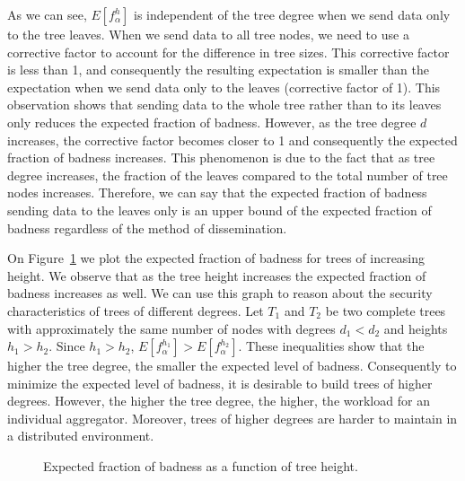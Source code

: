 \documentclass[11pt,twocolumn]{MyTightStyle}
\theoremstyle{plain}
\theoremstyle{definition}
\theoremstyle{remark}
\numberwithin{equation}{section}
\begin{document}
  As we can see, $E[f^h_\alpha]$ is independent of the tree
  degree when we send data only to the tree leaves. When we send data
  to all tree nodes, we need to use a corrective factor to account for
  the difference in tree sizes. This corrective factor is less than
  1, and consequently the resulting expectation is smaller than the
  expectation when we send data only to the leaves (corrective factor
  of 1). This observation shows that sending data to the whole tree
  rather than to its leaves only reduces the expected fraction of
  badness. However, as the tree degree $d$ increases, the corrective
  factor becomes closer to 1 and consequently the expected fraction of
  badness increases. This phenomenon is due to the fact that as tree
  degree increases, the fraction of the leaves compared to the total
  number of tree nodes increases. Therefore, we can say that the
  expected fraction of badness sending data to the leaves only is an
  upper bound of the expected fraction of badness regardless of the
  method of dissemination. 



  On Figure~\ref{fig:exp_badness} we plot the expected fraction of
  badness for trees of increasing height. We observe that as the tree
  height increases the expected fraction of badness increases as
  well. We can use this graph to reason about the security
  characteristics of trees of different degrees. Let $T_1$ and $T_2$
  be two complete trees with approximately the same number of nodes
  with degrees $d_1 < d_2$ and heights $h_1 > h_2$. Since $h_1 >
  h_2$, $E[f^{h_1}_{\alpha}] > E[f^{h_2}_{\alpha}]$. These
  inequalities show that the higher the tree degree, the smaller the expected level of
  badness. Consequently to minimize the expected level of badness, it
  is desirable to build trees of higher degrees. However, the higher
  the tree degree, the higher, the workload for an individual
  aggregator. Moreover, trees of higher degrees are harder to
  maintain in a distributed environment. 

  \begin{figure}[htpb!]
    \begin{center}
      \caption{\label{fig:exp_badness} Expected fraction of badness as a
      function of tree height.}
    \end{center}
  \end{figure}
\end{document}
